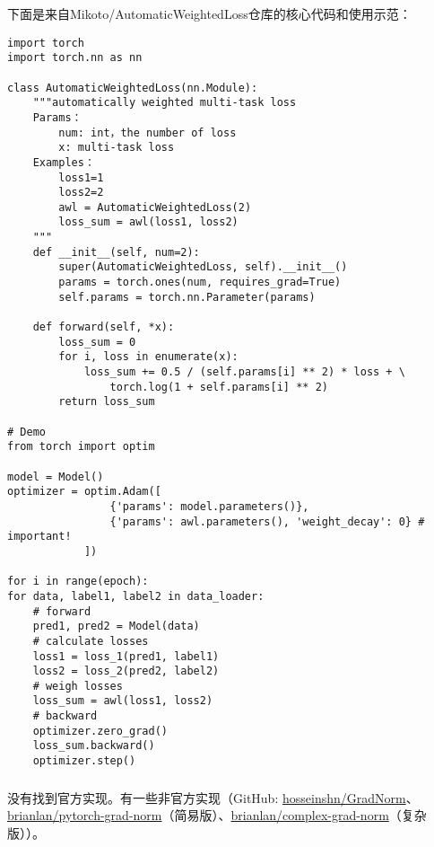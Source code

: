 \documentclass{ctexart}
\begin{document}
下面是来自Mikoto/Automatic\-Weighted\-Loss仓库的核心代码和使用示范：
\begin{verbatim}
import torch
import torch.nn as nn

class AutomaticWeightedLoss(nn.Module):
    """automatically weighted multi-task loss
    Params：
        num: int，the number of loss
        x: multi-task loss
    Examples：
        loss1=1
        loss2=2
        awl = AutomaticWeightedLoss(2)
        loss_sum = awl(loss1, loss2)
    """
    def __init__(self, num=2):
        super(AutomaticWeightedLoss, self).__init__()
        params = torch.ones(num, requires_grad=True)
        self.params = torch.nn.Parameter(params)

    def forward(self, *x):
        loss_sum = 0
        for i, loss in enumerate(x):
            loss_sum += 0.5 / (self.params[i] ** 2) * loss + \
                torch.log(1 + self.params[i] ** 2)
        return loss_sum

# Demo
from torch import optim

model = Model()
optimizer = optim.Adam([
                {'params': model.parameters()},
                {'params': awl.parameters(), 'weight_decay': 0} # important!
            ])

for i in range(epoch):
for data, label1, label2 in data_loader:
    # forward
    pred1, pred2 = Model(data)
    # calculate losses
    loss1 = loss_1(pred1, label1)
    loss2 = loss_2(pred2, label2)
    # weigh losses
    loss_sum = awl(loss1, loss2)
    # backward
    optimizer.zero_grad()
    loss_sum.backward()
    optimizer.step()
\end{verbatim}

\subsubsection{}

没有找到官方实现。有一些非官方实现（GitHub: \href{https://github.com/hosseinshn/GradNorm}{hosseinshn/GradNorm}、\href{https://github.com/brianlan/pytorch-grad-norm}{brianlan/pytorch-grad-norm}（简易版）、\href{https://github.com/brianlan/complex-grad-norm}{brianlan/complex-grad-norm}（复杂版））。
\end{document}
